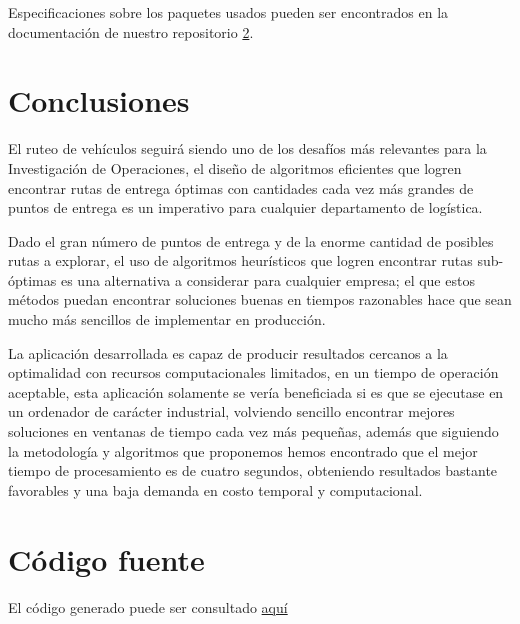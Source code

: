 \documentclass[journal]{IEEEtran}
\begin{document}
        Especificaciones sobre los paquetes usados pueden ser encontrados en la documentación de nuestro repositorio \ref{code:repo}.

    \section{Conclusiones} \label{sec:conclusions}
        
        El ruteo de vehículos seguirá siendo uno de los desafíos más relevantes para la Investigación de Operaciones, el diseño de algoritmos eficientes que logren encontrar rutas de entrega óptimas con cantidades cada vez más grandes de puntos de entrega es un imperativo para cualquier departamento de logística.
        
        Dado el gran número de puntos de entrega y de la enorme cantidad de posibles rutas a explorar, el uso de algoritmos heurísticos que logren encontrar rutas sub-óptimas es una alternativa a considerar para cualquier empresa; el que estos métodos puedan encontrar soluciones buenas en tiempos razonables hace que sean mucho más sencillos de implementar en producción.
        
        La aplicación desarrollada es capaz de producir resultados cercanos a la optimalidad con recursos computacionales limitados, en un tiempo de operación aceptable, esta aplicación solamente se vería beneficiada si es que se ejecutase en un ordenador de carácter industrial, volviendo sencillo encontrar mejores soluciones en ventanas de tiempo cada vez más pequeñas, además que siguiendo la metodología y algoritmos que proponemos hemos encontrado que el mejor tiempo de procesamiento es de cuatro segundos, obteniendo resultados bastante favorables y una baja demanda en costo temporal y computacional.
        
    \appendices
    
    \section{Código fuente}\label{code:repo}
    
        El código generado puede ser consultado \href{https://github.com/JuanEcheagaray75/capacitated-vrp}{aquí}
    
    
    
\end{document}
